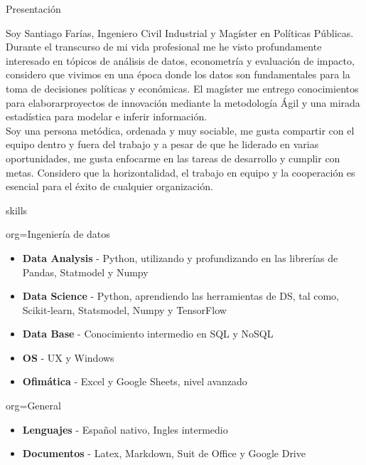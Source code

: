\documentclass{resume}
\begin{document}
\makeheader
\begin{ResumeSection}{Presentación}
    \begin{ResumeSubsection}{}
Soy Santiago Farías, Ingeniero Civil Industrial y Magíster en Políticas Públicas. Durante el transcurso de mi vida profesional me he visto profundamente interesado en tópicos de análisis de datos, econometría y evaluación de impacto, considero que vivimos en una época donde los datos son fundamentales para la toma de decisiones políticas y económicas. El magíster me entrego conocimientos para elaborarproyectos de innovación mediante la metodología Ágil y una mirada estadística para modelar e inferir información.
\\
Soy una persona metódica, ordenada y muy sociable, me gusta compartir con el equipo dentro y fuera del trabajo y a pesar de que he liderado en varias oportunidades, me gusta enfocarme en las tareas de desarrollo y cumplir con metas. Considero que la horizontalidad, el trabajo en equipo y la cooperación es esencial para el éxito de cualquier organización. 
    \end{ResumeSubsection}
    
\begin{ResumeSection}{skills}
    \newcommand{\skill}[2]{\textbf{#1} - #2}
    \begin{ResumeSubsection}{org=Ingeniería de datos}
        \begin{itemize}
            \item \skill{Data Analysis}{Python, utilizando y profundizando en las librerías de Pandas, Statmodel y Numpy}
            \item \skill{Data Science}{Python, aprendiendo las herramientas de DS, tal como, Scikit-learn, Statsmodel, Numpy y TensorFlow}            
            \item \skill{Data Base}{Conocimiento intermedio en SQL y NoSQL }
            \item \skill{OS}{UX y Windows}
            \item \skill{Ofimática}{Excel y Google Sheets, nivel avanzado }
        \end{itemize}
    \end{ResumeSubsection}
    \begin{ResumeSubsection}{org=General}
        \begin{itemize}
            \item \skill{Lenguajes}{Español nativo, Ingles intermedio}
            \item \skill{Documentos}{Latex, Markdown, Suit de Office y Google Drive}
        \end{itemize}
    \end{ResumeSubsection}



\end{ResumeSection}
\end{ResumeSection}
\end{document}
